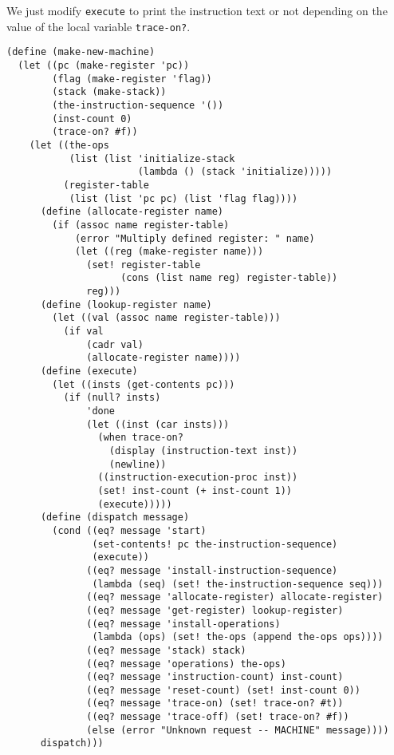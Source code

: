 \documentclass[a4paper,12pt]{article}
\begin{document}
We just modify \lstinline!execute! to print the instruction text or
not depending on the value of the local variable \lstinline!trace-on?!.

\begin{lstlisting}
(define (make-new-machine)
  (let ((pc (make-register 'pc))
        (flag (make-register 'flag))
        (stack (make-stack))
        (the-instruction-sequence '())
        (inst-count 0)
        (trace-on? #f))
    (let ((the-ops
           (list (list 'initialize-stack
                       (lambda () (stack 'initialize)))))
          (register-table
           (list (list 'pc pc) (list 'flag flag))))
      (define (allocate-register name)
        (if (assoc name register-table)
            (error "Multiply defined register: " name)
            (let ((reg (make-register name)))
              (set! register-table
                    (cons (list name reg) register-table))
              reg)))
      (define (lookup-register name)
        (let ((val (assoc name register-table)))
          (if val
              (cadr val)
              (allocate-register name))))
      (define (execute)
        (let ((insts (get-contents pc)))
          (if (null? insts)
              'done
              (let ((inst (car insts)))
                (when trace-on?
                  (display (instruction-text inst))
                  (newline))
                ((instruction-execution-proc inst))
                (set! inst-count (+ inst-count 1))
                (execute)))))
      (define (dispatch message)
        (cond ((eq? message 'start)
               (set-contents! pc the-instruction-sequence)
               (execute))
              ((eq? message 'install-instruction-sequence)
               (lambda (seq) (set! the-instruction-sequence seq)))
              ((eq? message 'allocate-register) allocate-register)
              ((eq? message 'get-register) lookup-register)
              ((eq? message 'install-operations)
               (lambda (ops) (set! the-ops (append the-ops ops))))
              ((eq? message 'stack) stack)
              ((eq? message 'operations) the-ops)
              ((eq? message 'instruction-count) inst-count)
              ((eq? message 'reset-count) (set! inst-count 0))
              ((eq? message 'trace-on) (set! trace-on? #t))
              ((eq? message 'trace-off) (set! trace-on? #f))
              (else (error "Unknown request -- MACHINE" message))))
      dispatch)))
\end{lstlisting}
\end{document}
